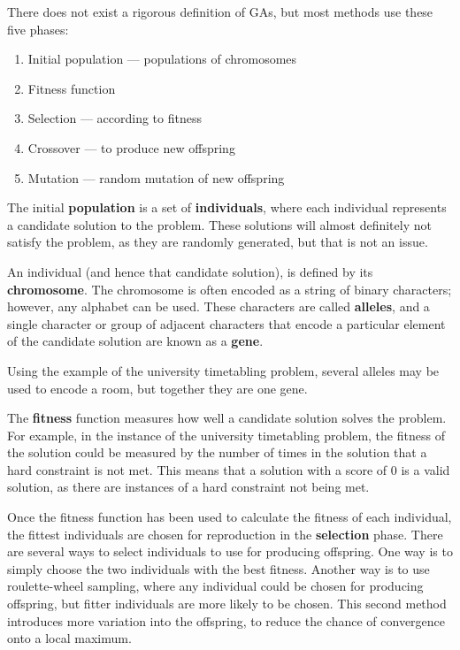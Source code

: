 \documentclass[a4paper, 12pt]{report}
\begin{document}
There does not exist a rigorous definition of GAs, but most methods use these
five phases:

\begin{enumerate}
	\item Initial population --- populations of chromosomes
	\item Fitness function
	\item Selection --- according to fitness
	\item Crossover --- to produce new offspring
	\item Mutation --- random mutation of new offspring
\end{enumerate}

The initial \textbf{population} is a set of \textbf{individuals}, where each
individual represents a candidate solution to the problem.
These solutions will almost definitely not satisfy the problem, as they are
randomly generated, but that is not an issue.

An individual (and hence that candidate solution), is defined by its
\textbf{chromosome}.
The chromosome is often encoded as a string of binary characters; however, any
alphabet can be used.
These characters are called \textbf{alleles}, and a single character or group of
adjacent characters that encode a particular element of the candidate solution
are known as a \textbf{gene}.

Using the example of the university timetabling problem, several alleles may be
used to encode a room, but together they are one gene.

The \textbf{fitness} function measures how well a candidate solution solves the
problem.
For example, in the instance of the university timetabling problem, the fitness 
of the solution could be measured by the number of times in the solution that a
hard constraint is not met.
This means that a solution with a score of 0 is a valid solution, as there are
instances of a hard constraint not being met.

Once the fitness function has been used to calculate the fitness of each
individual, the fittest individuals are chosen for reproduction in the
\textbf{selection} phase.
There are several ways to select individuals to use for producing offspring.
One way is to simply choose the two individuals with the best fitness.
Another way is to use roulette-wheel sampling, where any individual could be
chosen for producing offspring, but fitter individuals are more likely to be
chosen.
This second method introduces more variation into the offspring, to reduce the
chance of convergence onto a local maximum.
\end{document}
